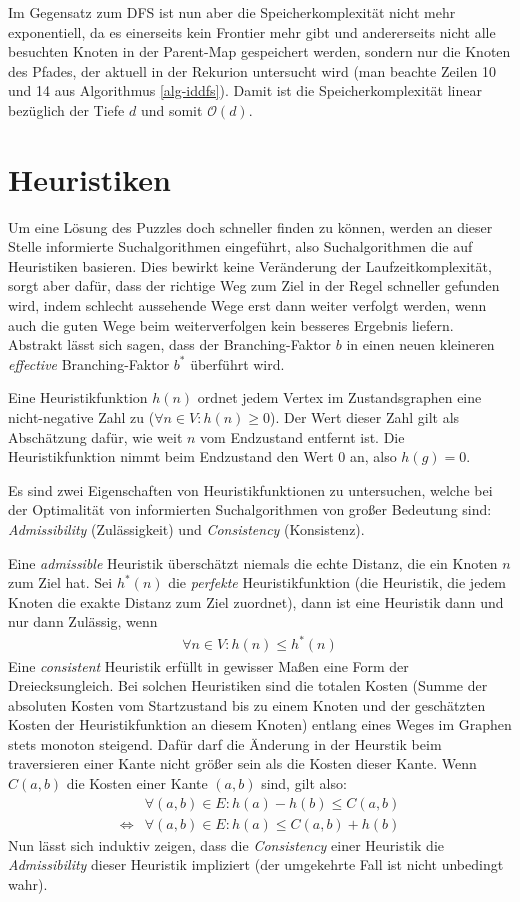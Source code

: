 \documentclass{whswinvcbook}
\begin{document}
Im Gegensatz zum DFS ist nun aber die Speicherkomplexität nicht mehr exponentiell, da es einerseits kein Frontier mehr gibt und andererseits nicht alle besuchten Knoten in der Parent-Map gespeichert werden, sondern nur die Knoten des Pfades, der aktuell in der Rekurion untersucht wird (man beachte Zeilen 10 und 14 aus Algorithmus \ref{alg-iddfs}). Damit ist die Speicherkomplexität linear bezüglich der Tiefe $d$ und somit $\mathcal{O}(d)$.
\section{Heuristiken}
Um eine Lösung des Puzzles doch schneller finden zu können, werden an dieser Stelle informierte Suchalgorithmen eingeführt, also Suchalgorithmen die auf Heuristiken basieren. Dies bewirkt keine Veränderung der Laufzeitkomplexität, sorgt aber dafür, dass der richtige Weg zum Ziel in der Regel schneller gefunden wird, indem schlecht aussehende Wege erst dann weiter verfolgt werden, wenn auch die guten Wege beim weiterverfolgen kein besseres Ergebnis liefern. Abstrakt lässt sich sagen, dass der Branching-Faktor $b$ in einen neuen kleineren \textit{effective} Branching-Faktor $b^*$ überführt wird.

Eine Heuristikfunktion $h(n)$ ordnet jedem Vertex im Zustandsgraphen eine nicht-negative Zahl zu ($\forall n\in V:h(n)\geq0$). Der Wert dieser Zahl gilt als Abschätzung dafür, wie weit $n$ vom Endzustand entfernt ist. Die Heuristikfunktion nimmt beim Endzustand den Wert $0$ an, also $h(g)=0$.

Es sind zwei Eigenschaften von Heuristikfunktionen zu untersuchen, welche bei der Optimalität von informierten Suchalgorithmen von großer Bedeutung sind: \textit{Admissibility} (Zulässigkeit) und \textit{Consistency} (Konsistenz).

Eine \textit{admissible} Heuristik überschätzt niemals die echte Distanz, die ein Knoten $n$ zum Ziel hat. Sei $h^*(n)$ die \textit{perfekte} Heuristikfunktion (die Heuristik, die jedem Knoten die exakte Distanz zum Ziel zuordnet), dann ist eine Heuristik dann und nur dann Zulässig, wenn
\begin{align}\label{eq-ad}
    \forall n\in V:h(n)\leq h^*(n)
\end{align}
Eine \textit{consistent} Heuristik erfüllt in gewisser Maßen eine Form der Dreiecksungleich. Bei solchen Heuristiken sind die totalen Kosten (Summe der absoluten Kosten vom Startzustand bis zu einem Knoten und der geschätzten Kosten der Heuristikfunktion an diesem Knoten) entlang eines Weges im Graphen stets monoton steigend. Dafür darf die Änderung in der Heurstik beim traversieren einer Kante nicht größer sein als die Kosten dieser Kante. Wenn $C(a,b)$ die Kosten einer Kante $(a,b)$ sind, gilt also:
\begin{align}
    &\forall(a,b)\in E:h(a)-h(b)\leq C(a,b)\label{eq-con1}\\
    \Longleftrightarrow&\forall(a,b)\in E:h(a)\leq C(a,b)+h(b)\label{eq-con2}
\end{align}
Nun lässt sich induktiv zeigen, dass die \textit{Consistency} einer Heuristik die \textit{Admissibility} dieser Heuristik impliziert (der umgekehrte Fall ist nicht unbedingt wahr).
\end{document}
